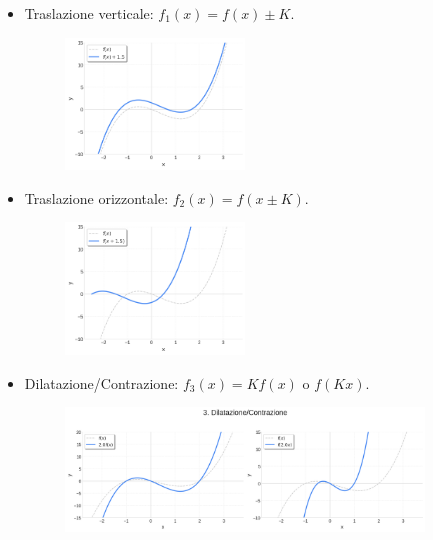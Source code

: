 \begin{itemize}
\item Traslazione verticale: $f_1(x) = f(x) \pm K$.
  \begin{figure}[H] %
    \centering
    \includegraphics[width=0.45\textwidth]{img/traslazione_verticale.png}
  \end{figure}

\item Traslazione orizzontale: $f_2(x) = f(x \pm K)$.
    \begin{figure}[H]
    \centering
    \includegraphics[width=0.45\textwidth]{img/traslazione_orizzontale.png}
  \end{figure}

\item Dilatazione/Contrazione: $f_3(x) = K f(x)$ o $f(K x)$.
    \begin{figure}[H]
    \centering
    \includegraphics[width=0.9\textwidth]{img/dilatazione.png}
  \end{figure}


\end{itemize}
